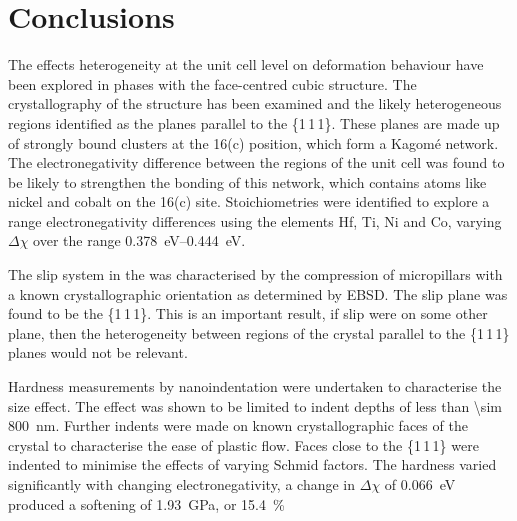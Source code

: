 \section{Conclusions}


The effects heterogeneity at the unit cell level on deformation behaviour have been explored in phases with the face-centred cubic  structure. The crystallography of the structure has been examined and the likely heterogeneous regions identified as the planes parallel to the \{1\,1\,1\}. These planes are made up of strongly bound clusters at the 16(c) position, which form a Kagom\'{e} network. The electronegativity difference between the regions of the unit cell was found to be likely to strengthen the bonding of this network, which contains atoms like nickel and cobalt on the 16(c) site. Stoichiometries were identified to explore a range electronegativity differences using the elements Hf, Ti, Ni and Co, varying $\Delta \chi$ over the range \SIrange{0.378}{0.444}{eV}.

The slip system in the  was characterised by the compression of micropillars with a known crystallographic orientation as determined by EBSD. The slip plane was found to be the \{1\,1\,1\}. This is an important result, if slip were on some other plane, then the heterogeneity between regions of the crystal parallel to the \{1\,1\,1\} planes would not be relevant.

Hardness measurements by nanoindentation were undertaken to characterise the size effect. The effect was shown to be limited to indent depths of less than \SI{\sim 800}{\nano\meter}. Further indents were made on known crystallographic faces of the crystal to characterise the ease of plastic flow. Faces close to the \{1\,1\,1\} were indented to minimise the effects of varying Schmid factors. The hardness varied significantly with changing electronegativity, a change in $\Delta \chi$ of \SI{0.066}{\electronvolt} produced a softening of \SI{1.93}{\giga\pascal}, or \SI{15.4}{\percent} 

